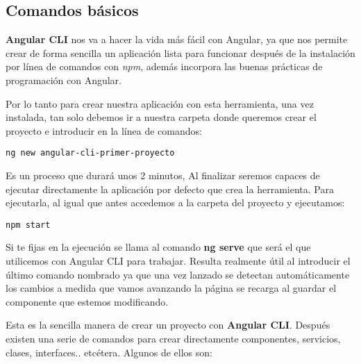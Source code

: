 \subsection{Comandos básicos}\label{cbasicos}
\textbf{Angular CLI} nos va a hacer la vida más fácil con Angular, ya que nos permite crear de forma sencilla un aplicación lista para funcionar después de la instalación por línea de comandos con \emph{npm}, además incorpora las buenas prácticas de programación con Angular. 


Por lo tanto para crear nuestra aplicación con esta herramienta, una vez instalada, tan solo debemos ir a nuestra carpeta donde queremos crear el proyecto e introducir en la línea de comandos: 
	\lstset{language=C, breaklines=true, basicstyle=\footnotesize}
		\begin{lstlisting}[frame=single]
		ng new angular-cli-primer-proyecto
    	\end{lstlisting}
 
 Es un proceso que durará unos 2 minutos,  Al finalizar seremos capaces de ejecutar directamente la aplicación por defecto que crea la herramienta. Para ejecutarla, al igual que antes accedemos a la carpeta del proyecto y ejecutamos:
 	\lstset{language=C, breaklines=true, basicstyle=\footnotesize}
		\begin{lstlisting}[frame=single]
		 npm start
    	\end{lstlisting}
    	
    	
 Si te fijas en la ejecución se llama al comando \textbf{ng serve} que será el que utilicemos con Angular CLI para trabajar. Resulta realmente útil al introducir el último comando nombrado ya que una vez lanzado se detectan automáticamente los cambios a medida que vamos avanzando la página se recarga al guardar el componente que estemos modificando.  
    	
    	
   Esta es la sencilla manera de crear un proyecto con \textbf{Angular CLI}. Después existen una serie de comandos para crear directamente componentes, servicios, clases, interfaces.. etcétera.  Algunos de ellos son:
   
